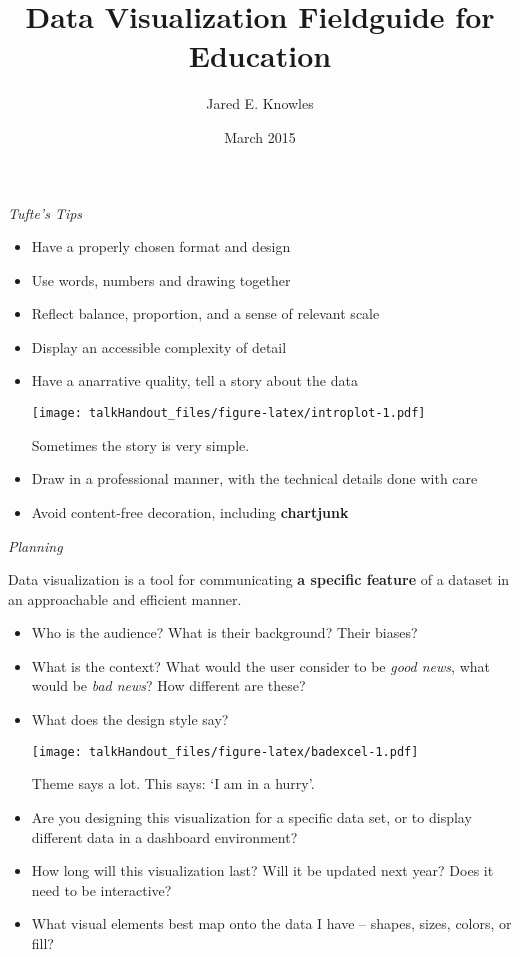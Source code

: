 \documentclass{tufte-handout}
\title{Data Visualization Fieldguide for Education}
\author{Jared E. Knowles}
\date{March 2015}
\begin{document}
\maketitle


\vspace{5mm}
\noindent \emph{Tufte's Tips}

\begin{itemize}
\itemsep1pt\parskip0pt
\item
  Have a properly chosen format and design
\item
  Use words, numbers and drawing together
\item
  Reflect balance, proportion, and a sense of relevant scale
\item
  Display an accessible complexity of detail
\item
  Have a anarrative quality, tell a story about the data

  \begin{marginfigure}
   \texttt{[image: talkHandout\_files/figure-latex/introplot-1.pdf]}
  \caption{Sometimes the story is very simple.}
  \end{marginfigure}
\item
  Draw in a professional manner, with the technical details done with
  care
\item
  Avoid content-free decoration, including \textbf{chartjunk}
\end{itemize}

\vspace{2.5mm}
\noindent \emph{Planning}

\noindent Data visualization is a tool for communicating \textbf{a
specific feature} of a dataset in an approachable and efficient
manner.

\begin{itemize}
\itemsep1pt\parskip0pt
\item
  Who is the audience? What is their background? Their biases?
\item
  What is the context? What would the user consider to be \emph{good
  news}, what would be \emph{bad news}? How different are these?
\item
  What does the design style say?

  \begin{marginfigure}
   \texttt{[image: talkHandout\_files/figure-latex/badexcel-1.pdf]}
  \caption{Theme says a lot. This says: `I am in a hurry'.}
  \end{marginfigure}
\item
  Are you designing this visualization for a specific data set, or to
  display different data in a dashboard environment?
\item
  How long will this visualization last? Will it be updated next year?
  Does it need to be interactive?
\item
  What visual elements best map onto the data I have -- shapes, sizes,
  colors, or fill?
\end{itemize}
\end{document}
